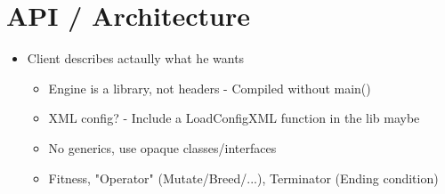 
\date{17 Aug 2011}



\section{API / Architecture}
\begin{itemize}
 \item{Client describes actaully what he wants}
 \begin{itemize}
  \item{Engine is a library, not headers - Compiled without main()}
  \item{XML config? - Include a LoadConfigXML function in the lib maybe}
  \item{No generics, use opaque classes/interfaces}
  \item{Fitness, "Operator" (Mutate/Breed/...), Terminator (Ending condition)}
 \end{itemize}
\end{itemize}



